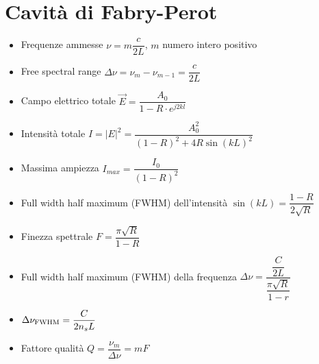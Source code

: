 \documentclass{article}
\begin{document}
\section {Cavità di Fabry-Perot}
\begin{itemize}
  \item Frequenze ammesse \(  \nu = m \dfrac{c}{2L} \), \( m \) numero intero positivo
  \item Free spectral range \( \Delta \nu = \nu_{m} - \nu_{m-1} = \dfrac{c}{2L} \)
  \item Campo elettrico totale \( \vec{E} = \dfrac{A_0}{1-R \cdot e^ {j 2 k l}} \)
  \item Intensità totale \( I = | E | ^ 2 = \dfrac{A_0^2}{(1-R)^2+ 4 R \sin(kL)^2} \)
  \item Massima ampiezza \( I_{max} = \dfrac{I_0}{(1-R)^2} \)
  \item Full width half maximum (FWHM) dell'intensità \( \sin(k L) = \dfrac{1 - R}{2 \sqrt{R}} \)
  \item Finezza spettrale \( F = \dfrac{\pi \sqrt{R}}{1-R} \)
  \item Full width half maximum (FWHM) della frequenza \( \Delta \nu  = \dfrac{\dfrac{C}{2L}}{\dfrac{\pi \sqrt{R}}{1 - r}} \)
  \item \( \Delta \nu _ {\textnormal{FWHM}} = \dfrac{C}{2 n_s L} \)
  \item Fattore qualità \( Q = \dfrac{\nu_m}{\Delta \nu} = m F \)
\end{itemize}
\end{document}
